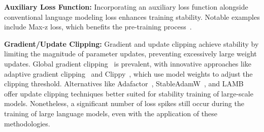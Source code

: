 \textbf{Auxiliary Loss Function:} Incorporating an auxiliary loss function alongside conventional language modeling loss enhances training stability. Notable examples include Max-z loss, which benefits the pre-training process~\cite{chowdhery2023palm, wortsman2023small, yang2023baichuan}.

\textbf{Gradient/Update Clipping:} Gradient and update clipping achieve stability by limiting the magnitude of parameter updates, preventing excessively large weight updates. Global gradient clipping~\cite{pascanu2013difficulty} is prevalent, with innovative approaches like adaptive gradient clipping~\cite{brock2021high} and Clippy~\cite{tang2023improving}, which use model weights to adjust the clipping threshold.  Alternatives like Adafactor~\cite{shazeer2018adafactor}, StableAdamW~\cite{wortsman2023stable}, and LAMB~\cite{you2019large} offer update clipping techniques better suited for stability training of large-scale models. Nonetheless, a significant number of loss spikes still occur during the training of large language models, even with the application of these methodologies.
